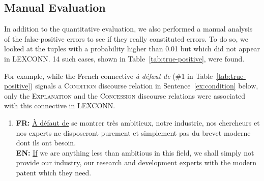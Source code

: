 \documentclass[11pt,a4paper]{article}
\begin{document}
\begin{table*}[t]
            \centering
        \caption{Error analysis of the potential false positive entries. \checkmark indicates newly discoursed mappings which are not included in LEXCONN.
        }
    \label{tab:true-positive}
\end{table*}%

\subsection{Manual Evaluation}

In addition to the quantitative evaluation, we also performed a manual analysis of the false-positive errors to see if they really constituted errors.  To do so, we looked at the tuples with a probability higher than 0.01 but which did not appear in LEXCONN. 14 such cases, shown in Table~\ref{tab:true-positive}, were found.  

For example, while the French connective \textit{à défaut de} (\#1 in Table~\ref{tab:true-positive}) signals a \textsc{Condition} discourse relation in Sentence~\ref{ex:condition} below, only the \textsc{Explanation} and the \textsc{Concession} discourse relations were associated with this connective in LEXCONN. 

\begin{enumerate}[label*=(\arabic*)]
    \item \label{ex:condition} 
    \textbf{FR:} \underline{À défaut de} se montrer très ambitieux, notre industrie, nos chercheurs et nos experts ne disposeront purement et simplement pas du brevet moderne dont ils ont besoin. \\
    \textbf{EN:} \underline{If} we are anything less than ambitious in this field, we shall simply not provide our industry, our research and development experts with the modern patent which they need.  
\end{enumerate}
\end{document}
